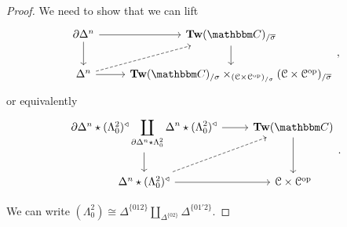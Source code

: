 \documentclass[main.tex]{subfiles}
\begin{document}
\begin{proof}
  We need to show that we can lift
  \begin{equation*}
    \begin{tikzcd}
      \partial \Delta^{n}
      \arrow[r]
      \arrow[d]
      & \Tw(\CC)_{/ \overline{\sigma}}
      \arrow[d]
      \\
      \Delta^{n}
      \arrow[r]
      \arrow[ur, dashed]
      & \Tw(\CC)_{/ \sigma} \times_{(\category{C} \times \category{C}\op)_{/\sigma}}(\category{C} \times \category{C}\op)_{/\overline{\sigma}}
    \end{tikzcd},
  \end{equation*}
  or equivalently
  \begin{equation*}
    \begin{tikzcd}
      \partial \Delta^{n} \star (\Lambda^{2}_{0})^{\triangleleft} \displaystyle\coprod_{\partial \Delta^{n} \star \Lambda^{2}_{0}} \Delta^{n} \star (\Lambda^{2}_{0})^{\triangleleft}
      \arrow[r]
      \arrow[d]
      & \Tw(\CC)
      \arrow[d]
      \\
      \Delta^{n} \star (\Lambda^{2}_{0})^{\triangleleft}
      \arrow[r]
      \arrow[ur, dashed]
      & \category{C} \times \category{C}\op
    \end{tikzcd}.
  \end{equation*}

  We can write $(\Lambda^{2}_{0}) \cong \Delta^{\{012\}} \amalg_{\Delta^{\{02\}}} \Delta^{\{01'2\}}$.
\end{proof}
\end{document}
